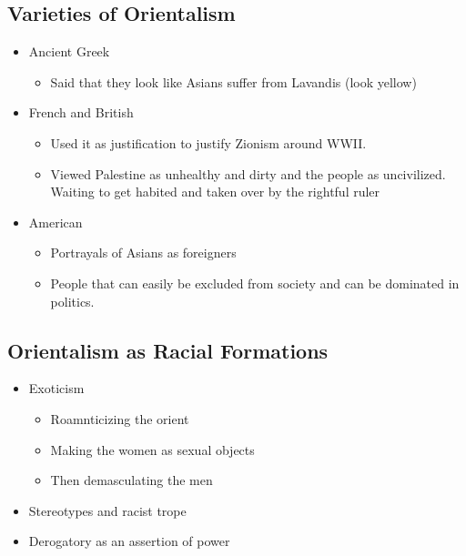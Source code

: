 \documentclass{article}
\begin{document}
\subsection{Varieties of Orientalism}
\begin{itemize}
  \item Ancient Greek
    \begin{itemize}
      \item Said that they look like Asians
        suffer from Lavandis (look yellow)
    \end{itemize}
  \item French and British
    \begin{itemize}
      \item Used it as justification to justify
        Zionism around WWII.
      \item Viewed Palestine as unhealthy and dirty
        and the people as uncivilized. Waiting to get
        habited and taken over by 
        the rightful ruler
    \end{itemize}
  \item American
    \begin{itemize}
      \item Portrayals of Asians as foreigners
      \item People that can easily be excluded from society
        and can be dominated in politics.
    \end{itemize}
\end{itemize}

\subsection{Orientalism as Racial Formations}
\begin{itemize}
  \item Exoticism
    \begin{itemize}
      \item Roamnticizing the orient
      \item Making the women as sexual objects
      \item Then demasculating the men
    \end{itemize}
  \item Stereotypes and racist trope
  \item Derogatory as an assertion of power
\end{itemize}
\end{document}
